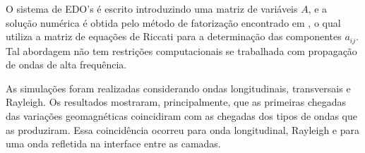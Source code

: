 O sistema de EDO's \'e escrito introduzindo uma matriz de vari\'aveis $A$, e a solu\c{c}\~ao num\'erica \'e obtida pelo m\'etodo de fatoriza\c{c}\~ao encontrado em \cite{Mikhailenko_89}, o qual utiliza a matriz de equa\c{c}\~oes de Riccati para a determina\c{c}\~ao das componentes $a_{ij}$. Tal abordagem n\~ao tem restri\c{c}\~oes computacionais se trabalhada com propaga\c{c}\~ao de ondas de alta frequ\^encia.

As simula\c{c}\~oes foram realizadas considerando ondas longitudinais, transversais e Rayleigh. Os resultados  mostraram, principalmente, que as primeiras chegadas das varia\c{c}\~oes geomagn\'eticas coincidiram com as chegadas dos tipos de ondas que as produziram. Essa coincid\^encia ocorreu para onda longitudinal, Rayleigh e para uma onda refletida na interface entre as camadas.








